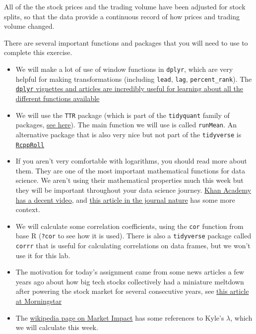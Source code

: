 \documentclass[
  letterpaper,
  DIV=11,
  numbers=noendperiod]{scrartcl}
\providecommand{\tightlist}{%
  \setlength{\itemsep}{0pt}\setlength{\parskip}{0pt}}\usepackage{longtable,booktabs,array}
\begin{document}
All of the the stock prices and the trading volume have been adjusted
for stock splits, so that the data provide a continuous record of how
prices and trading volume changed.

There are several important functions and packages that you will need to
use to complete this exercise.

\begin{itemize}
\tightlist
\item
  We will make a lot of use of window functions in \texttt{dplyr}, which
  are very helpful for making transformations (including \texttt{lead},
  \texttt{lag}, \texttt{percent\_rank}). The
  \href{https://dplyr.tidyverse.org/articles/window-functions.html}{\texttt{dplyr}
  vignettes and articles are incredibly useful for learning about all
  the different functions available}
\item
  We will use the \texttt{TTR} package (which is part of the
  \texttt{tidyquant} family of packages,
  \href{https://cran.r-project.org/web/packages/tidyquant/vignettes/TQ02-quant-integrations-in-tidyquant.html}{see
  here}). The main function we will use is called \texttt{runMean}. An
  alternative package that is also very nice but not part of the
  \texttt{tidyverse} is
  \href{https://CRAN.R-project.org/package=RcppRoll}{\texttt{RcppRoll}}
\item
  If you aren't very comfortable with logarithms, you should read more
  about them. They are one of the most important mathematical functions
  for data science. We aren't using their mathematical properties much
  this week but they will be important throughout your data science
  journey.
  \href{https://www.khanacademy.org/math/algebra2/x2ec2f6f830c9fb89:logs/x2ec2f6f830c9fb89:log-intro/v/logarithms}{Khan
  Academy has a decent video}, and
  \href{https://www.nature.com/articles/news.2008.866}{this article in
  the journal nature} has some more context.
\item
  We will calculate some correlation coefficients, using the
  \texttt{cor} function from base R (\texttt{?cor} to see how it is
  used). There is also a \texttt{tidyverse} package called
  \texttt{corrr} that is useful for calculating correlations on data
  frames, but we won't use it for this lab.
\item
  The motivation for today's assignment came from some news articles a
  few years ago about how big tech stocks collectively had a miniature
  meltdown after powering the stock market for several consecutive
  years, see
  \href{https://www.morningstar.com/markets/5-charts-big-tech-stocks-collapse}{this
  article at Morningstar}
\item
  The \href{https://en.wikipedia.org/wiki/Market_impact}{wikipedia page
  on Market Impact} has some references to Kyle's \(\lambda\), which we
  will calculate this week.
\end{itemize}
\end{document}
